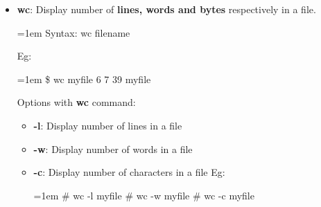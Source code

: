 \begin{flushleft}
\begin{itemize}
		\bigskip
		\bigskip
		\item \textbf{wc}: Display number of \textbf{lines, words and bytes} respectively in a file.
		\bigskip
		\begin{tcolorbox}[breakable,notitle,boxrule=-0pt,colback=pink,colframe=pink]
			\color{black}
			\font=1em
			Syntax: wc filename
			\font=4pt
		\end{tcolorbox}
		Eg:
		\bigskip
		\begin{tcolorbox}[breakable,notitle,boxrule=-0pt,colback=black,colframe=black]
			\color{green}
			\font=1em
			\$ wc myfile
			\newline
			\color{white}
			6 7 39 myfile
			\font=4pt
		\end{tcolorbox}	

		Options with \textbf{wc} command:
		\begin{itemize}
			\item \textbf{-l}: Display number of lines in a file
			\item \textbf{-w}: Display number of words in a file
			\item \textbf{-c}: Display number of characters in a file
			\newline
			Eg:
			\begin{tcolorbox}[breakable,notitle,boxrule=-0pt,colback=black,colframe=black]
				\color{green}
				\font=1em
				\# wc -l myfile
				\newline
				\# wc -w myfile
				\newline
				\# wc -c myfile
				\font=4pt
			\end{tcolorbox}	
		\end{itemize}

		\bigskip
		\bigskip


\end{itemize}
\end{flushleft}
